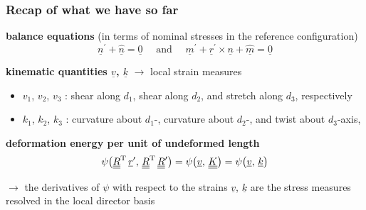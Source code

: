 \begin{frame}
  \frametitle{Recap of what we have so far}
  \textbf{balance equations} (in terms of nominal stresses in the reference configuration)
  \begin{displaymath}
    \underline{n}^{\prime} + \underline{\hat{n}} = \underline{0}
    \quad \text{ and } \quad
    \underline{m}^{\prime} + \underline{r}^{\prime} \times \underline{n} + \underline{\hat{m}} = \underline{0}
  \end{displaymath}
  
  \vspace{1.2em}
  \textbf{kinematic quantities $\underline{v}$, $\underline{k}$} \newline
  $\rightarrow$ local strain measures
  \begin{itemize}
    \item $v_1$, $v_2$, $v_3$ : shear along $d_1$, shear along $d_2$, and stretch along $d_3$, respectively
    \item $k_1$, $k_2$, $k_3$ : curvature about $d_1$-, curvature about $d_2$-, and twist about  $d_3$-axis, %
  \end{itemize}
  
  \vspace{1.2em}
  \textbf{deformation energy per unit of undeformed length} \newline
  \begin{displaymath}
    \psi \bigl( \underline{\underline{R}}^{\mathrm{T}} \, \underline{r}^{\prime} , \, \underline{\underline{R}}^{\mathrm{T}} \, \underline{\underline{R}}^{\prime} \bigr) =
    \psi \bigl( \underline{v} , \, \underline{\underline{K}} \bigr) =
    \psi \bigl( \underline{v} , \, \underline{k} \bigr)
  \end{displaymath}
  
  \vspace{0.5em}
  $\rightarrow$ the derivatives of $\psi$ with respect to the strains $\underline{v}$, $\underline{k}$ are the stress measures resolved in the local director basis
\end{frame}


